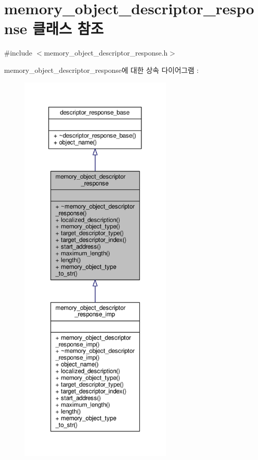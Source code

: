 \hypertarget{classavdecc__lib_1_1memory__object__descriptor__response}{}\section{memory\+\_\+object\+\_\+descriptor\+\_\+response 클래스 참조}
\label{classavdecc__lib_1_1memory__object__descriptor__response}


{\ttfamily \#include $<$memory\+\_\+object\+\_\+descriptor\+\_\+response.\+h$>$}



memory\+\_\+object\+\_\+descriptor\+\_\+response에 대한 상속 다이어그램 \+: 
\nopagebreak
\begin{figure}[H]
\begin{center}
\leavevmode
\includegraphics[height=550pt]{classavdecc__lib_1_1memory__object__descriptor__response__inherit__graph}
\end{center}
\end{figure}


